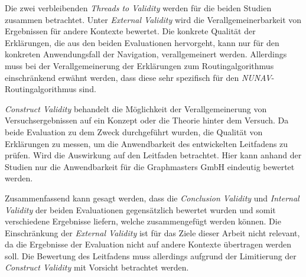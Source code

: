 \smallskip

Die zwei verbleibenden \textit{Threads to Validity} werden für die beiden Studien zusammen betrachtet. Unter \textit{External Validity} wird die Verallgemeinerbarkeit von Ergebnissen für andere Kontexte bewertet. Die konkrete Qualität der Erklärungen, die aus den beiden Evaluationen hervorgeht, kann nur für den konkreten Anwendungsfall der Navigation, verallgemeinert werden. Allerdings muss bei der Verallgemeinerung der Erklärungen zum Routingalgorithmus einschränkend erwähnt werden, dass diese sehr spezifisch für den \textit{NUNAV}-Routingalgorithmus sind.

\textit{Construct Validity} behandelt die Möglichkeit der Verallgemeinerung von Versuchsergebnissen auf ein Konzept oder die Theorie hinter dem Versuch. Da beide Evaluation zu dem Zweck durchgeführt wurden, die Qualität von Erklärungen zu messen, um die Anwendbarkeit des entwickelten Leitfadens zu prüfen. Wird die Auswirkung auf den Leitfaden betrachtet. Hier kann anhand der Studien nur die Anwendbarkeit für die Graphmasters GmbH eindeutig bewertet werden. 

\smallskip

Zusammenfassend kann gesagt werden, dass die \textit{Conclusion Validity} und \textit{Internal Validity} der beiden Evaluationen gegensätzlich bewertet wurden und somit verschiedene Ergebnisse liefern, welche zusammengefügt werden können. Die Einschränkung der \textit{External Validity} ist für das Ziele dieser Arbeit nicht relevant, da die Ergebnisse der Evaluation nicht auf andere Kontexte übertragen werden soll. Die Bewertung des Leitfadens muss allerdings aufgrund der Limitierung der \textit{Construct Validity} mit Vorsicht betrachtet werden.